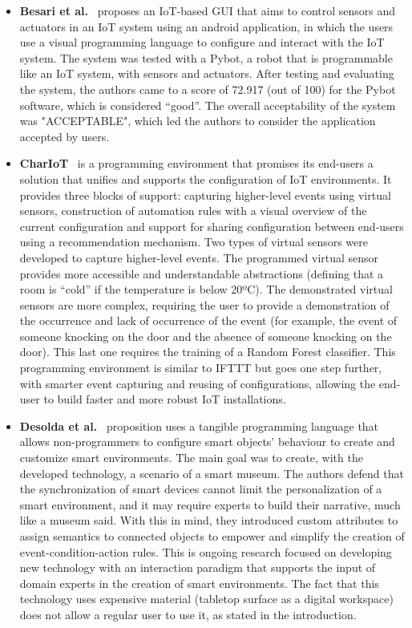 \begin{itemize}
\item\textbf{Besari et al.}~\cite{mobile_apps_rpi,pre_mobile_apps_rpi} proposes an IoT-based GUI that aims to control sensors and actuators in an IoT system using an android application, in which the users use a visual programming language to configure and interact with the IoT system. The system was tested with a Pybot, a robot that is programmable like an IoT system, with sensors and actuators. After testing and evaluating the system, the authors came to a score of 72.917 (out of 100) for the Pybot software, which is considered ``good''. The overall acceptability of the system was "ACCEPTABLE", which led the authors to consider the application accepted by users.

\item\textbf{CharIoT}~\cite{chariot} is a programming environment that promises its end-users a solution that unifies and supports the configuration of IoT environments. It provides three blocks of support: capturing higher-level events using virtual sensors, construction of automation rules with a visual overview of the current configuration and support for sharing configuration between end-users using a recommendation mechanism. Two types of virtual sensors were developed to capture higher-level events. The programmed virtual sensor provides more accessible and understandable abstractions (defining that a room is ``cold'' if the temperature is below 20ºC). The demonstrated virtual sensors are more complex, requiring the user to provide a demonstration of the occurrence and lack of occurrence of the event (for example, the event of someone knocking on the door and the absence of someone knocking on the door). This last one requires the training of a Random Forest classifier. This programming environment is similar to IFTTT but goes one step further, with smarter event capturing and reusing of configurations, allowing the end-user to build faster and more robust IoT installations.

\item\textbf{Desolda et al.}~\cite{desolda} proposition uses a tangible programming language that allows non-programmers to configure smart objects' behaviour to create and customize smart environments. The main goal was to create, with the developed technology, a scenario of a smart museum. The authors defend that the synchronization of smart devices cannot limit the personalization of a smart environment, and it may require experts to build their narrative, much like a museum said. With this in mind, they introduced custom attributes to assign semantics to connected objects to empower and simplify the creation of event-condition-action rules. This is ongoing research focused on developing new technology with an interaction paradigm that supports the input of domain experts in the creation of smart environments. The fact that this technology uses expensive material (tabletop surface as a digital workspace) does not allow a regular user to use it, as stated in the introduction.


\end{itemize}
